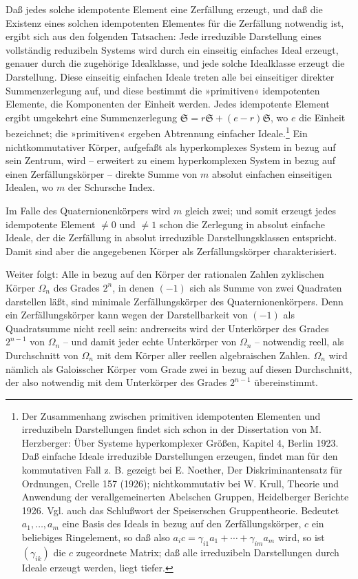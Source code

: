 \documentclass[11pt]{article}
\providecommand{\mS}{\mathfrak{S}}
\begin{document}
Daß jedes solche idempotente Element eine Zerfällung erzeugt, und daß die Existenz eines solchen idempotenten Elementes für die Zerfällung notwendig ist, ergibt sich aus den folgenden Tatsachen: Jede irreduzible Darstellung eines vollständig reduzibeln Systems wird durch ein einseitig einfaches Ideal erzeugt, genauer durch die zugehörige Idealklasse, und jede solche Idealklasse erzeugt die Darstellung. Diese einseitig einfachen Ideale treten alle bei einseitiger direkter Summenzerlegung auf, und diese bestimmt die »primitiven« idempotenten Elemente, die Komponenten der Einheit werden. Jedes idempotente Element ergibt umgekehrt eine Summenzerlegung $\mS=r\mS+(e-r)\mS$, wo $e$ die Einheit bezeichnet; die »primitiven« ergeben Abtrennung einfacher Ideale.\footnote{Der Zusammenhang zwischen primitiven idempotenten Elementen und irreduzibeln Darstellungen findet sich schon in der Dissertation von M. Herzberger: Über Systeme hyperkomplexer Größen, Kapitel 4, Berlin 1923. Daß einfache Ideale irreduzible Darstellungen erzeugen, findet man für den kommutativen Fall z. B. gezeigt bei E. Noether, Der Diskriminantensatz für Ordnungen, Crelle 157 (1926); nichtkommutativ bei W. Krull, Theorie und Anwendung der verallgemeinerten Abelschen Gruppen, Heidelberger Berichte 1926. Vgl. auch das Schlußwort der Speiserschen Gruppentheorie. Bedeutet $a_1,\ldots,a_m$ eine Basis des Ideals in bezug auf den Zerfällungskörper, $c$ ein beliebiges Ringelement, so daß also $a_i c=\gamma_{i1}a_1+\cdots+\gamma_{im}a_m$ wird, so ist $(\gamma_{ik})$ die $c$ zugeordnete Matrix; daß alle irreduzibeln Darstellungen durch Ideale erzeugt werden, liegt tiefer.} Ein nichtkommutativer Körper, aufgefaßt als hyperkomplexes System in bezug auf sein Zentrum, wird -- erweitert zu einem hyperkomplexen System in bezug auf einen Zerfällungskörper -- direkte Summe von $m$ absolut einfachen einseitigen Idealen, wo $m$ der Schursche Index.

Im Falle des Quaternionenkörpers wird $m$ gleich zwei; und somit erzeugt jedes idempotente Element $\ne0$ und $\ne1$ schon die Zerlegung in absolut einfache Ideale, der die Zerfällung in absolut irreduzible Darstellungsklassen entspricht. Damit sind aber die angegebenen Körper als Zerfällungskörper charakterisiert.

Weiter folgt: Alle in bezug auf den Körper der rationalen Zahlen zyklischen Körper $\Omega_n$ des Grades $2^n$, in denen $(-1)$ sich als Summe von zwei Quadraten darstellen läßt, sind minimale Zerfällungskörper des Quaternionenkörpers. Denn ein Zerfällungskörper kann wegen der Darstellbarkeit von $(-1)$ als Quadratsumme nicht reell sein: andrerseits wird der Unterkörper des Grades $2^{n-1}$ von $\Omega_n$ -- und damit jeder echte Unterkörper von $\Omega_n$ -- notwendig reell, als Durchschnitt von $\Omega_n$ mit dem Körper aller reellen algebraischen Zahlen. $\Omega_n$ wird nämlich als Galoisscher Körper vom Grade zwei in bezug auf diesen Durchschnitt, der also notwendig mit dem Unterkörper des Grades $2^{n-1}$ übereinstimmt.
\end{document}

